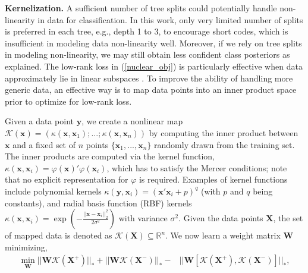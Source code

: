\documentclass[runningheads]{llncs}
\begin{document}
\textbf{Kernelization.}  A sufficient number of tree splits could potentially
handle non-linearity in data for classification. In this work, only very limited
number of splits is preferred in each tree, e.g., depth 1 to 3, to encourage
short codes, which is insufficient in modeling data non-linearity
well. Moreover, if we rely on tree splits in modeling non-linearity, we may
still obtain less confident class posteriors as explained.  The low-rank loss in
(\ref{nuclear_obj}) is particularly effective when data approximately lie in
linear subspaces \cite{lowrankT}.  To improve the ability of handling more
generic data, an effective way is to map data points into an inner product space
prior to optimize for low-rank loss.

Given a data point $\mathbf{y}$, we create a nonlinear map
$\mathcal{K}(\mathbf{x}) = (\kappa(\mathbf{x}, \mathbf{x}_1); ...;
\kappa(\mathbf{x}, \mathbf{x}_n))$ by computing the inner product between
$\mathbf{x}$ and a fixed set of $n$ points $\{\mathbf{x}_1, ..., \mathbf{x}_n\}$
randomly drawn from the training set. The inner products are computed via the
kernel function, $\kappa(\mathbf{x}, \mathbf{x}_i) = \varphi(\mathbf{x})'
\varphi(\mathbf{x}_i)$, which has to satisfy the Mercer conditions; note that no
explicit representation for $\varphi$ is required. Examples of kernel functions
include polynomial kernels $\kappa(\mathbf{y}, \mathbf{x}_i) =
(\mathbf{x}'\mathbf{x}_i+p)^q$ (with $p$ and $q$ being constants), and radial
basis function (RBF) kernels $\kappa(\mathbf{x}, \mathbf{x}_i) = \exp
(-\frac{||\mathbf{x}-\mathbf{x}_i||_2^2}{2\sigma^2})$ with variance $\sigma^2$.
Given the data points $\mathbf{X}$, the set of mapped data is denoted as
$\mathcal{K}(\mathbf{X}) \subseteq \mathbb{R}^n$.  We now learn a weight matrix
$\mathbf{W}$ minimizing,
\begin{align} \label{knuclear_obj} \nonumber
\underset{\mathbf{W}}  \min ||\mathbf{W} \mathcal{K}(\mathbf{X}^+)||_* + ||\mathbf{W} \mathcal{K}(\mathbf{X}^-)||_* -& ||\mathbf{W} [\mathcal{K}(\mathbf{X}^+), \mathcal{K}(\mathbf{X}^-)]||_*, \\
\end{align}
\end{document}
